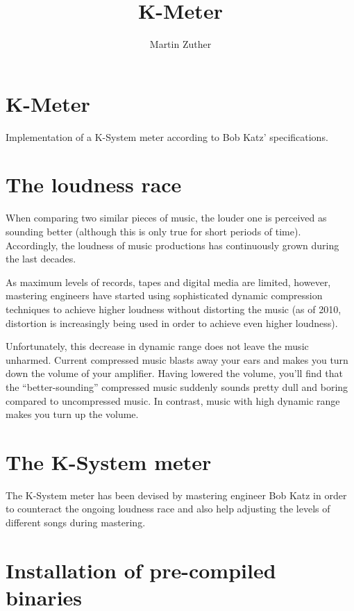 


\title{K-Meter}
\author{Martin Zuther}

\usepackage[inner=18mm,outer=18mm,top=26mm,bottom=27mm,headsep=6.5mm,headheight=5mm]{geometry}

\DeclareRobustCommand*{\application}[1]{\texttt{#1}}



\section{K-Meter}

Implementation of a K-System meter according to Bob Katz' specifications.

\section{The loudness race}

When comparing two similar pieces of music, the louder one is
perceived as sounding better (although this is only true for short
periods of time).  Accordingly, the loudness of music productions has
continuously grown during the last decades.

As maximum levels of records, tapes and digital media are limited,
however, mastering engineers have started using sophisticated dynamic
compression techniques to achieve higher loudness without distorting
the music (as of 2010, distortion is increasingly being used in order
to achieve even higher loudness).

Unfortunately, this decrease in dynamic range does not leave the music
unharmed.  Current compressed music blasts away your ears and makes
you turn down the volume of your amplifier.  Having lowered the
volume, you'll find that the ``better-sounding'' compressed music
suddenly sounds pretty dull and boring compared to uncompressed music.
In contrast, music with high dynamic range makes you turn up the
volume.

\section{The K-System meter}

The K-System meter has been devised by mastering engineer Bob Katz in
order to counteract the ongoing loudness race and also help adjusting
the levels of different songs during mastering.

\section{Installation of pre-compiled binaries}

